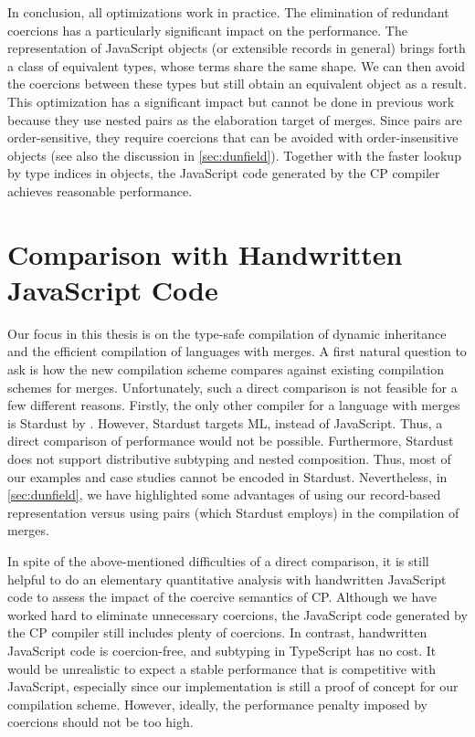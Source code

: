 In conclusion, all optimizations work in practice. The elimination of redundant
coercions has a particularly significant impact on the performance. The
representation of JavaScript objects (or extensible records in general) brings
forth a class of equivalent types, whose terms share the same shape. We can then
avoid the coercions between these types but still obtain an equivalent object as
a result. This optimization has a significant impact but cannot be done in
previous work~\citep{dunfield2014elaborating,oliveira2016disjoint} because they
use nested pairs as the elaboration target of merges. Since pairs are
order-sensitive, they require coercions that can be avoided with
order-insensitive objects (see also the discussion in \autoref{sec:dunfield}).
Together with the faster lookup by type indices in objects, the JavaScript code
generated by the CP compiler achieves reasonable performance.

\section{Comparison with Handwritten JavaScript Code}

Our focus in this thesis is on the type-safe compilation of dynamic inheritance
and the efficient compilation of languages with merges. A first natural question
to ask is how the new compilation scheme compares against existing compilation
schemes for merges. Unfortunately, such a direct comparison is not feasible for
a few different reasons. Firstly, the only other compiler for a language with
merges is Stardust by \citet{dunfield2014elaborating}. However, Stardust targets
ML, instead of JavaScript. Thus, a direct comparison of performance would not be
possible. Furthermore, Stardust does not support distributive subtyping and
nested composition. Thus, most of our examples and case studies cannot be
encoded in Stardust. Nevertheless, in \autoref{sec:dunfield}, we have
highlighted some advantages of using our record-based representation versus
using pairs (which Stardust employs) in the compilation of merges.  

In spite of the above-mentioned difficulties of a direct comparison, it is still
helpful to do an elementary quantitative analysis with handwritten JavaScript
code to assess the impact of the coercive semantics of CP. Although we have
worked hard to eliminate unnecessary coercions, the JavaScript code generated by
the CP compiler still includes plenty of coercions. In contrast, handwritten
JavaScript code is coercion-free, and subtyping in TypeScript has no cost. It
would be unrealistic to expect a stable performance that is competitive with
JavaScript, especially since our implementation is still a proof of concept for
our compilation scheme. However, ideally, the performance penalty imposed by
coercions should not be too high.

